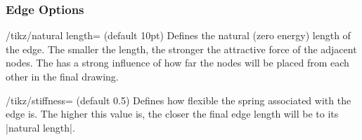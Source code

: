 %

%



\subsubsection{Edge Options}

\begin{key}{/tikz/natural length= (default 10pt)}
  Defines the natural (zero energy) length of the edge. The smaller the
  length, the stronger the attractive force of the adjacent nodes. The
   has a strong influence of how far the nodes will be
  placed from each other in the final drawing.
  \begin{codeexample}[]
  \end{codeexample}
\end{key}

\begin{key}{/tikz/stiffness= (default 0.5)}
  Defines how flexible the spring associated with the edge is. The
  higher this value is, the closer the final edge length will be to its
  |natural length|.
  \begin{codeexample}[]
  \end{codeexample}
\end{key}

